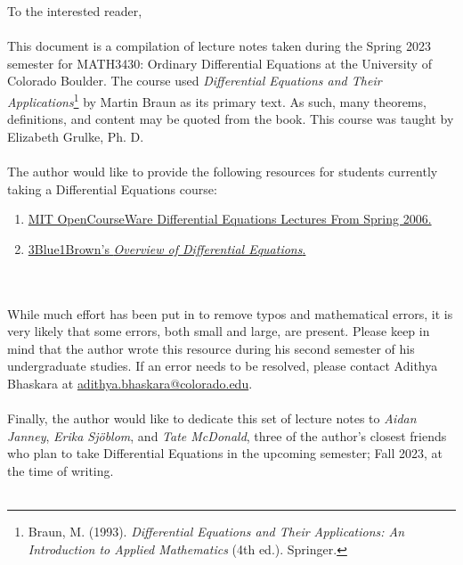 To the interested reader,
\\
\\
This document is a compilation of lecture notes taken during the Spring 2023 semester for MATH3430: Ordinary Differential Equations at the University of Colorado Boulder. The course used \textit{Differential Equations and Their Applications}\footnote{Braun, M. (1993). \textit{Differential Equations and Their Applications: An Introduction to Applied Mathematics} (4th ed.). Springer. } by Martin Braun as its primary text. As such, many theorems, definitions, and content may be quoted from the book. This course was taught by Elizabeth Grulke, Ph. D.
\\
\\
The author would like to provide the following resources for students currently taking a Differential Equations course:
\begin{enumerate}
    \item \href{https://www.youtube.com/playlist?list=PLEC88901EBADDD980}{MIT OpenCourseWare Differential Equations Lectures From Spring 2006.}
    \item \href{https://www.youtube.com/playlist?list=PLZHQObOWTQDNPOjrT6KVlfJuKtYTftqH6}{3Blue1Brown's \textit{Overview of Differential Equations}.}
\end{enumerate}
\vphantom
\\
\\
While much effort has been put in to remove typos and mathematical errors, it is very likely that some errors, both small and large, are present. Please keep in mind that the author wrote this resource during his second semester of his undergraduate studies. If an error needs to be resolved, please contact Adithya Bhaskara at \href{mailto:adithya.bhaskara@colorado.edu}{adithya.bhaskara@colorado.edu}.
\\
\\
Finally, the author would like to dedicate this set of lecture notes to \textit{Aidan Janney}, \textit{Erika Sj\"{o}blom}, and \textit{Tate McDonald}, three of the author's closest friends who plan to take Differential Equations in the upcoming semester; Fall 2023, at the time of writing.
\\
\\
\vfill
{}